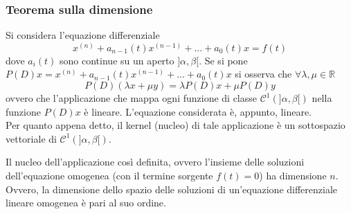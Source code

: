\documentclass[10pt]{article}
\theoremstyle{plain}
\begin{document}
\subsubsection{Teorema sulla dimensione}
Si considera l'equazione differenziale 
\[x^{(n)} + a_{n-1}(t)x^{(n-1)} + ... + a_0(t) x = f(t)\]
dove $a_i(t)$ sono continue su un aperto $]\alpha, \beta[$. Se si pone $P(D)x = x^{(n)} + a_{n-1}(t)x^{(n-1)} + ... + a_0(t) x$ si osserva che $\forall \lambda, \mu \in \mathbb{R}$
\[P(D)(\lambda x + \mu y) = \lambda P(D) x + \mu P(D) y\]
ovvero che l'applicazione che mappa ogni funzione di classe $\mathcal{C}^1(]\alpha, \beta[)$ nella funzione $P(D)x$ è lineare. L'equazione considerata è, appunto, lineare.
\\Per quanto appena detto, il kernel (nucleo) di tale applicazione è un sottospazio vettoriale di $\mathcal{C}^1(]\alpha, \beta[)$.
\begin{ther}
Il nucleo dell'applicazione così definita, ovvero l'insieme delle soluzioni dell'equazione omogenea (con il termine sorgente $f(t) = 0$) ha dimensione $n$. Ovvero, la dimensione dello spazio delle soluzioni di un'equazione differenziale lineare omogenea è pari al suo ordine.
\end{ther}
\end{document}
